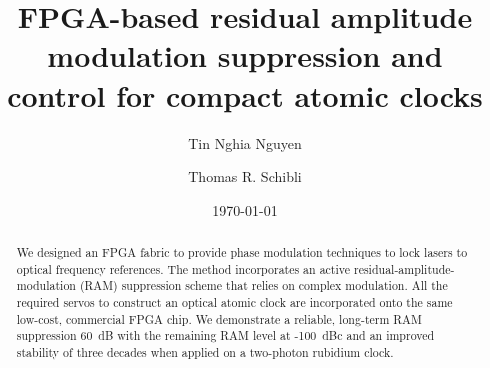 \documentclass[aip,graphicx]{revtex4-2}
\begin{document}
	
	
	\title{FPGA-based residual amplitude modulation suppression and control for compact atomic clocks} %
	
	
	
	\author{Tin Nghia Nguyen}
	
	\author{Thomas R. Schibli}
	
	\date{\today}
	
	\begin{abstract}
		We designed an FPGA fabric to provide phase modulation techniques to lock lasers to optical frequency references. The method incorporates an active residual-amplitude-modulation (RAM) suppression scheme that relies on complex modulation. All the required servos to construct an optical atomic clock are incorporated onto the same low-cost, commercial FPGA chip. We demonstrate a reliable, long-term RAM suppression 60~dB with the remaining RAM level at -100~dBc and an improved stability of three decades when applied on a two-photon rubidium clock.
	\end{abstract}
	
	\pacs{}%
	
	\maketitle %
	
\end{document}
